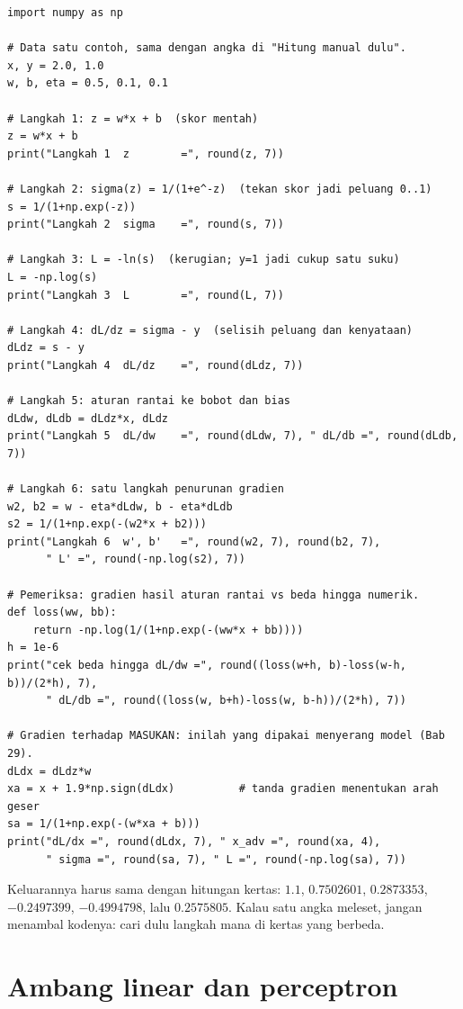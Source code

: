 \begin{lab}
\begin{verbatim}
import numpy as np

# Data satu contoh, sama dengan angka di "Hitung manual dulu".
x, y = 2.0, 1.0
w, b, eta = 0.5, 0.1, 0.1

# Langkah 1: z = w*x + b  (skor mentah)
z = w*x + b
print("Langkah 1  z        =", round(z, 7))

# Langkah 2: sigma(z) = 1/(1+e^-z)  (tekan skor jadi peluang 0..1)
s = 1/(1+np.exp(-z))
print("Langkah 2  sigma    =", round(s, 7))

# Langkah 3: L = -ln(s)  (kerugian; y=1 jadi cukup satu suku)
L = -np.log(s)
print("Langkah 3  L        =", round(L, 7))

# Langkah 4: dL/dz = sigma - y  (selisih peluang dan kenyataan)
dLdz = s - y
print("Langkah 4  dL/dz    =", round(dLdz, 7))

# Langkah 5: aturan rantai ke bobot dan bias
dLdw, dLdb = dLdz*x, dLdz
print("Langkah 5  dL/dw    =", round(dLdw, 7), " dL/db =", round(dLdb, 7))

# Langkah 6: satu langkah penurunan gradien
w2, b2 = w - eta*dLdw, b - eta*dLdb
s2 = 1/(1+np.exp(-(w2*x + b2)))
print("Langkah 6  w', b'   =", round(w2, 7), round(b2, 7),
      " L' =", round(-np.log(s2), 7))

# Pemeriksa: gradien hasil aturan rantai vs beda hingga numerik.
def loss(ww, bb):
    return -np.log(1/(1+np.exp(-(ww*x + bb))))
h = 1e-6
print("cek beda hingga dL/dw =", round((loss(w+h, b)-loss(w-h, b))/(2*h), 7),
      " dL/db =", round((loss(w, b+h)-loss(w, b-h))/(2*h), 7))

# Gradien terhadap MASUKAN: inilah yang dipakai menyerang model (Bab 29).
dLdx = dLdz*w
xa = x + 1.9*np.sign(dLdx)          # tanda gradien menentukan arah geser
sa = 1/(1+np.exp(-(w*xa + b)))
print("dL/dx =", round(dLdx, 7), " x_adv =", round(xa, 4),
      " sigma =", round(sa, 7), " L =", round(-np.log(sa), 7))
\end{verbatim}

Keluarannya harus sama dengan hitungan kertas: $1.1$, $0.7502601$, $0.2873353$,
$-0.2497399$, $-0.4994798$, lalu $0.2575805$. Kalau satu angka meleset, jangan menambal
kodenya: cari dulu langkah mana di kertas yang berbeda.
\end{lab}

\section{Ambang linear dan perceptron}

